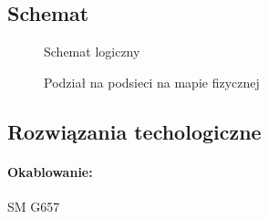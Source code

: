 \subsection{Schemat}
	\begin{center}
		\begin{figure}[h!]
			\caption{Schemat logiczny}
			\label{fig:schemat_logiczny}
		\end{figure}
		\begin{figure}[h!]
			\caption{Podział na podsieci na mapie fizycznej}
			\label{fig:podsieci}
		\end{figure}
	\end{center}

\subsection{Rozwiązania techologiczne}
	\paragraph{Okablowanie:}
		SM G657
